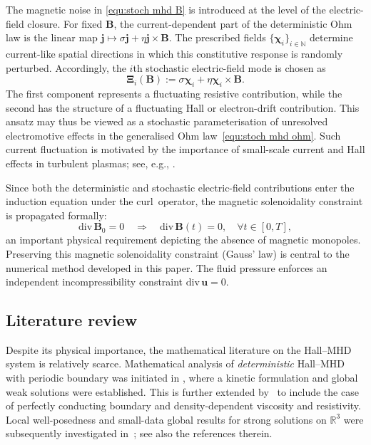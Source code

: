 \documentclass[11pt, reqno]{amsart}
\theoremstyle{definition}
\numberwithin{equation}{section}
\newcommand{\curl}{\mathrm{curl}\,}
\newcommand{\divg}{\mathrm{div}\,}
\newcommand{\bff}{\boldsymbol}
\newcommand{\bb}{\mathbb}
\begin{document}
The magnetic noise in \eqref{equ:stoch mhd B} is introduced at the level of the electric-field closure. For fixed $\bff{B}$, the current-dependent part of the deterministic Ohm law is the linear map $\bff{j}\mapsto \sigma\bff{j}+\eta\bff{j}\times\bff{B}$.
The prescribed fields $\{\bff{\chi}_i\}_{i\in \bb{N}}$ determine current-like spatial directions in which this constitutive response is randomly perturbed. Accordingly, the $i$th stochastic electric-field mode is chosen as
\[
\bff{\Xi}_i(\bff{B})
:=
\sigma\bff{\chi}_i
+\eta\bff{\chi}_i\times\bff{B}.
\]
The first component represents a fluctuating resistive contribution, while the second has the structure of a fluctuating Hall or electron-drift contribution. This ansatz may thus be viewed as a stochastic parameterisation of unresolved electromotive effects in the generalised Ohm law~\eqref{equ:stoch mhd ohm}. Such current fluctuation is motivated by the importance of
small-scale current and Hall effects in turbulent plasmas; see, e.g.,
\cite{KanVasCer06, MinAlePou07, MinGomMah03}.

Since both the deterministic and stochastic electric-field contributions enter the induction equation under the $\curl$ operator, the magnetic solenoidality constraint is propagated formally:
\[
\divg\bff{B}_0=0
\quad\Longrightarrow\quad
\divg\bff{B}(t)=0, \quad \forall t\in [0,T],
\]
an important physical requirement depicting the absence of magnetic monopoles. Preserving this magnetic solenoidality constraint (Gauss' law) is central to the numerical method developed in this paper.
The fluid pressure enforces an independent incompressibility constraint $\divg\bff{u}=0$. 


\subsection{Literature review}

Despite its physical importance, the mathematical literature on the Hall--MHD system is relatively scarce. Mathematical analysis of \emph{deterministic} Hall--MHD with periodic boundary was initiated in \cite{AchDegFroLiu11}, where a kinetic formulation and global weak solutions were established. This is further extended by~\cite{Tan21} to include the case of perfectly conducting boundary and density-dependent viscosity and resistivity. Local well-posedness and small-data global results for strong solutions on $\bb{R}^3$ were subsequently investigated in~\cite{ChaDegLiu14, Dai21}; see also the references therein. 
\end{document}
